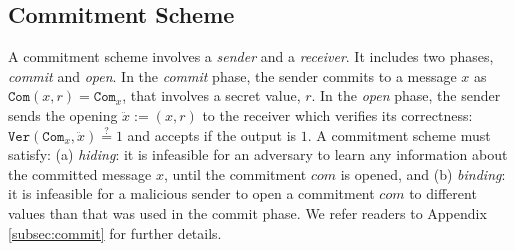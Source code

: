 
\vspace{-1.5mm}

\subsection{Commitment Scheme}\label{subsec:short-commit}
\vspace{-1mm}

A commitment scheme involves a  \emph{sender} and a \emph{receiver}. It includes  two phases, \emph{commit} and  \emph{open}. In the \emph{commit} phase, the sender  commits to a message $x$ as $\mathtt{Com}(x,r)=\mathtt{Com}_{\scriptscriptstyle x}$, that involves a secret value,  $r$. In the \emph{open} phase, the sender sends the opening $\ddot{x}:=(x,r)$ to the receiver which verifies its correctness: $\mathtt{Ver}(\mathtt{Com}_{\scriptscriptstyle x},\ddot{x})\stackrel{\scriptscriptstyle ?}=1$ and accepts if the output is $1$. A commitment scheme must satisfy: (a) \textit{hiding}: it is infeasible for an adversary to learn any information about the committed  message $x$, until the commitment ${com}$ is opened, and (b) \textit{binding}: it is infeasible for a malicious sender to open a commitment ${com}$ to different values than that was  used in the commit phase. We refer readers to Appendix \ref{subsec:commit} for further details. 




